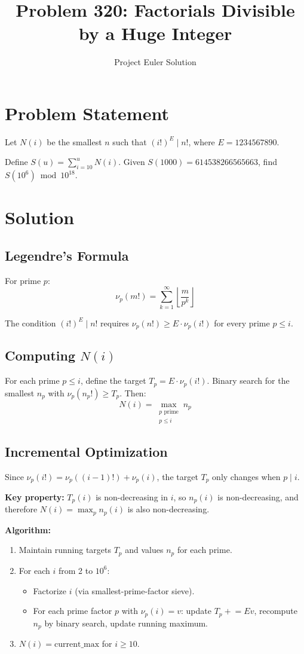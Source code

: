 \documentclass[12pt]{article}
\title{Problem 320: Factorials Divisible by a Huge Integer}
\author{Project Euler Solution}
\date{}
\begin{document}
\maketitle

\section{Problem Statement}
Let $N(i)$ be the smallest $n$ such that $(i!)^E \mid n!$, where $E = 1234567890$.

Define $S(u) = \sum_{i=10}^{u} N(i)$. Given $S(1000) = 614538266565663$, find $S(10^6) \bmod 10^{18}$.

\section{Solution}

\subsection{Legendre's Formula}
For prime $p$:
\[
\nu_p(m!) = \sum_{k=1}^{\infty} \left\lfloor \frac{m}{p^k}\right\rfloor
\]

The condition $(i!)^E \mid n!$ requires $\nu_p(n!) \ge E \cdot \nu_p(i!)$ for every prime $p \le i$.

\subsection{Computing $N(i)$}
For each prime $p \le i$, define the target $T_p = E \cdot \nu_p(i!)$. Binary search for the smallest $n_p$ with $\nu_p(n_p!) \ge T_p$. Then:
\[
N(i) = \max_{\substack{p \text{ prime} \\ p \le i}} n_p
\]

\subsection{Incremental Optimization}
Since $\nu_p(i!) = \nu_p((i-1)!) + \nu_p(i)$, the target $T_p$ only changes when $p \mid i$.

\textbf{Key property:} $T_p(i)$ is non-decreasing in $i$, so $n_p(i)$ is non-decreasing, and therefore $N(i) = \max_p n_p(i)$ is also non-decreasing.

\textbf{Algorithm:}
\begin{enumerate}
\item Maintain running targets $T_p$ and values $n_p$ for each prime.
\item For each $i$ from 2 to $10^6$:
  \begin{itemize}
    \item Factorize $i$ (via smallest-prime-factor sieve).
    \item For each prime factor $p$ with $\nu_p(i) = v$: update $T_p \mathrel{+}= Ev$, recompute $n_p$ by binary search, update running maximum.
  \end{itemize}
\item $N(i) = \text{current\_max}$ for $i \ge 10$.
\end{enumerate}
\end{document}
